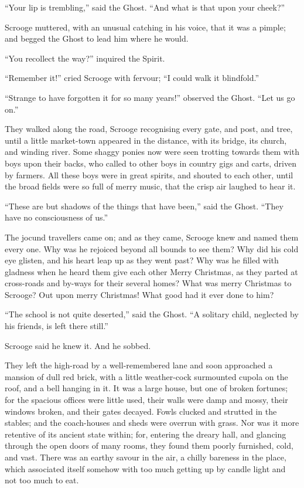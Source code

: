 \documentclass[paper=5.5in:8.5in,BCOR=7mm,twoside,DIV=calc,12pt,usegeometry]{scrbook} %
\begin{document}
\enquote{Your lip is trembling,} said the Ghost. \enquote{And what is that upon your cheek?}

Scrooge muttered, with an unusual catching in his voice, that it was a pimple; and begged the Ghost to lead him where he would.

\enquote{You recollect the way?} inquired the Spirit.

\enquote{Remember it!} cried Scrooge with fervour; \enquote{I could walk it blindfold.}

\enquote{Strange to have forgotten it for so many years!} observed the Ghost. \enquote{Let us go on.}

They walked along the road, Scrooge recognising every gate, and post, and tree, until a little market-town appeared in the distance, with its bridge, its church, and winding river. Some shaggy ponies now were seen trotting towards them with boys upon their backs, who called to other boys in country gigs and carts, driven by farmers. All these boys were in great spirits, and shouted to each other, until the broad fields were so full of merry music, that the crisp air laughed to hear it.

\enquote{These are but shadows of the things that have been,} said the Ghost. \enquote{They have no consciousness of us.}

The jocund travellers came on; and as they came, Scrooge knew and named them every one. Why was he rejoiced beyond all bounds to see them? Why did his cold eye glisten, and his heart leap up as they went past? Why was he filled with gladness when he heard them give each other Merry Christmas, as they parted at cross-roads and by-ways for their several homes? What was merry Christmas to Scrooge? Out upon merry Christmas! What good had it ever done to him?

\enquote{The school is not quite deserted,} said the Ghost. \enquote{A solitary child, neglected by his friends, is left there still.}

Scrooge said he knew it. And he sobbed.

They left the high-road by a well-remembered lane and soon approached a mansion of dull red brick, with a little weather-cock surmounted cupola on the roof, and a bell hanging in it. It was a large house, but one of broken fortunes; for the spacious offices were little used, their walls were damp and mossy, their windows broken, and their gates decayed. Fowls clucked and strutted in the stables; and the coach-houses and sheds were overrun with grass. Nor was it more retentive of its ancient state within; for, entering the dreary hall, and glancing through the open doors of many rooms, they found them poorly furnished, cold, and vast. There was an earthy savour in the air, a chilly bareness in the place, which associated itself somehow with too much getting up by candle light and not too much to eat.
\end{document}
